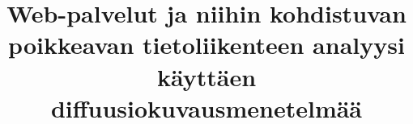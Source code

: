 \documentclass[finnish,logo,nonumbib,creativecommons,nocopyright,lof,pdftex,palatino,utf8]{gradu2}
\title{Web-palvelut ja niihin kohdistuvan poikkeavan tietoliikenteen
  analyysi käyttäen diffuusiokuvausmenetelmää}
\begin{document}




\mainmatter












{}
%



%
%
\end{document}
